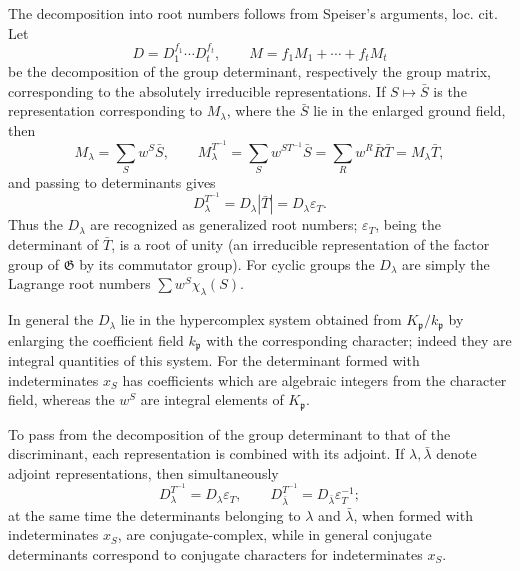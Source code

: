\documentclass[11pt]{article}
\providecommand{\frakp}{\mathfrak p}
\providecommand{\Gg}{\mathfrak G}
\begin{document}
The decomposition into root numbers follows from Speiser's arguments, loc. cit. Let
\[
        D=D_1^{f_1}\cdots D_t^{f_t},
        \qquad
        M=f_1M_1+\cdots+f_tM_t
\]
be the decomposition of the group determinant, respectively the group matrix, corresponding to the absolutely irreducible representations. If \(S\mapsto\bar S\) is the representation corresponding to \(M_\lambda\), where the \(\bar S\) lie in the enlarged ground field, then
\[
        M_\lambda=\sum_S w^S\bar S,
        \qquad
        M_\lambda^{T^{-1}}=\sum_S w^{ST^{-1}}\bar S
          =\sum_R w^R\bar R\bar T=M_\lambda\bar T,
\]
and passing to determinants gives
\[
        D_\lambda^{T^{-1}}=D_\lambda|\bar T|=D_\lambda\varepsilon_T.
\]
Thus the \(D_\lambda\) are recognized as generalized root numbers; \(\varepsilon_T\), being the determinant of \(\bar T\), is a root of unity (an irreducible representation of the factor group of \(\Gg\) by its commutator group). For cyclic groups the \(D_\lambda\) are simply the Lagrange root numbers \(\sum w^S\chi_\lambda(S)\).

In general the \(D_\lambda\) lie in the hypercomplex system obtained from \(K_\frakp/k_\frakp\) by enlarging the coefficient field \(k_\frakp\) with the corresponding character; indeed they are integral quantities of this system. For the determinant formed with indeterminates \(x_S\) has coefficients which are algebraic integers from the character field, whereas the \(w^S\) are integral elements of \(K_\frakp\).

To pass from the decomposition of the group determinant to that of the discriminant, each representation is combined with its adjoint. If \(\lambda,\bar\lambda\) denote adjoint representations, then simultaneously
\[
        D_\lambda^{T^{-1}}=D_\lambda\varepsilon_T,
        \qquad
        D_{\bar\lambda}^{T^{-1}}=D_{\bar\lambda}\varepsilon_T^{-1};
\]
at the same time the determinants belonging to \(\lambda\) and \(\bar\lambda\), when formed with indeterminates \(x_S\), are conjugate-complex, while in general conjugate determinants correspond to conjugate characters for indeterminates \(x_S\).
\end{document}

